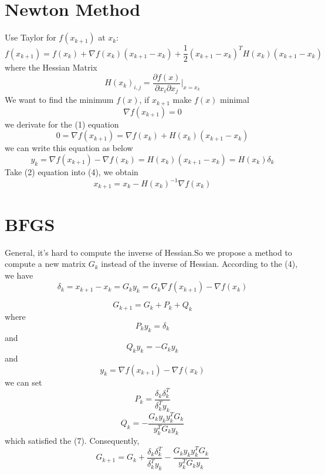 \documentclass{article}
\begin{document}
\section{Newton Method}
Use Taylor for $ f(x_{k+1})$  at $ x_k $:
\begin{equation}
f(x_{k+1}) = f(x_{k}) + \nabla f(x_{k})(x_{k+1}-x_{k}) + \frac{1}{2}(x_{k+1}-x_k)^TH(x_k)(x_{k+1}-x_k)
\end{equation}
where the Hessian Matrix 
$$H(x_k)_{i,j} = \frac{\partial f(x)}{\partial x_i \partial x_j}|_{x=x_k}$$
We want to find the minimum $f(x)$, if $x_{k+1}$ make $f(x)$ minimal 
\begin{equation}
\nabla f(x_{k+1}) = 0
\end{equation}
we derivate for the (1) equation
\begin{equation}
0 = \nabla f(x_{k+1}) = \nabla f(x_{k}) + H(x_k)(x_{k+1}-x_k) 
\end{equation}
we can write this equation as below 
\begin{equation}
y_k =  \nabla f(x_{k+1}) -\nabla f(x_{k})  = H(x_k)(x_{k+1}-x_k) = H(x_k) \delta_k
\end{equation}
Take (2) equation into (4), we obtain
\begin{equation}
x_{k+1} = x_k -H(x_k)^{-1} \nabla f(x_k)
\end{equation}
\section{BFGS}
General, it's hard to compute the inverse of Hessian.So we propose a method to compute a 
new matrix $G_k$ instead of the inverse of Hessian. According to the (4), we have 
\begin{equation}
\delta_k = x_{k+1}- x_k = G_k y_k = G_k \nabla f(x_{k+1}) -  \nabla f(x_k) 
\end{equation}

\begin{equation}
G_{k+1} = G_k + P_k + Q_k
\end{equation}
where $$P_k y_k = \delta_k $$ and $$ Q_k y_k = -G_k y_k$$ and $$y_k =  \nabla f(x_{k+1}) - \nabla f(x_k) $$
we can set 
\begin{equation}
P_k = \frac{\delta_k \delta_k^T}{\delta_k^T y_k}
\end{equation}
\begin{equation}
Q_k = -\frac{G_k y_k y_k^T G_k }{y_k^T G_k y_k}
\end{equation}
which satisfied the (7).
Consequently,
\begin{equation}
G_{k+1} = G_k + \frac{\delta_k \delta_k^T}{\delta_k^T y_k}  - \frac{G_k y_k y_k^T G_k }{y_k^T G_k y_k}
\end{equation}
\end{document}
